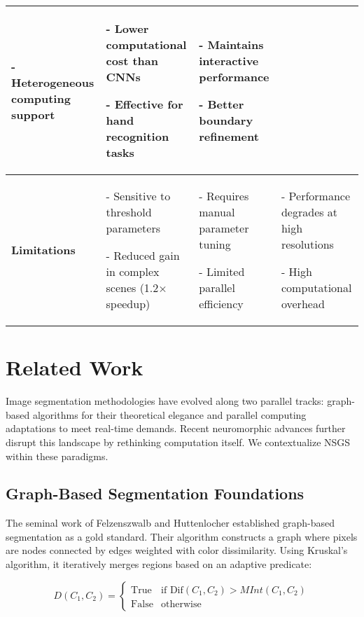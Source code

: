 \documentclass[conference]{IEEEtran}
\begin{document}
\begin{table*}[t]
{\begin{tabular}{|p{3.5cm}|p{4cm}|p{4cm}|p{4cm}|}
    - Heterogeneous computing support
     & 
    
        
    - Lower computational cost than CNNs
        
    - Effective for hand recognition tasks
     & 
    
        
    - Maintains interactive performance
        
    - Better boundary refinement
     \\
    \hline
    \textbf{Limitations} & 
    
        
    - Sensitive to threshold parameters
        
    - Reduced gain in complex scenes (1.2× speedup)
     & 
    
        
    - Requires manual parameter tuning
        
    - Limited parallel efficiency
     & 
    
        
    - Performance degrades at high resolutions
        
    - High computational overhead
     \\
    \hline
    \end{tabular}%
    }
    \end{table*}

\section{Related Work} \label{sec:related_work}
Image segmentation methodologies have evolved along two parallel tracks: graph-based algorithms for their theoretical elegance and parallel computing adaptations to meet real-time demands. Recent neuromorphic advances further disrupt this landscape by rethinking computation itself. We contextualize NSGS within these paradigms.

\subsection{Graph-Based Segmentation Foundations}
The seminal work of Felzenszwalb and Huttenlocher \cite{Felzenszwalb2004} established graph-based segmentation as a gold standard. Their algorithm constructs a graph where pixels are nodes connected by edges weighted with color dissimilarity. Using Kruskal's algorithm, it iteratively merges regions based on an adaptive predicate:

\begin{equation}
D(C_1, C_2) = 
\begin{cases}
\text{True} & \text{if } \text{Dif}(C_1, C_2) > MInt(C_1, C_2) \\
\text{False} & \text{otherwise}
\end{cases}
\end{equation}
\end{document}
